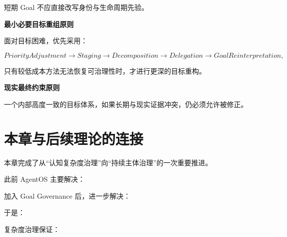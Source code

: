 \begin{statementbox}
\centering
{}
\end{statementbox}

短期 Goal 不应直接改写身份与生命周期先验。


\textbf{最小必要目标重组原则}

面对目标困难，优先采用：

\[
PriorityAdjustment
\rightarrow
Staging
\rightarrow
Decomposition
\rightarrow
Delegation
\rightarrow
GoalReinterpretation,
\]

只有较低成本方法无法恢复可治理性时，才进行更深的目标重构。


\textbf{现实最终约束原则}

\begin{statementbox}
\centering
{}
\end{statementbox}

一个内部高度一致的目标体系，如果长期与现实证据冲突，仍必须允许被修正。


\section{本章与后续理论的连接}

本章完成了从``认知复杂度治理''向``持续主体治理''的一次重要推进。

此前 AgentOS 主要解决：

\begin{statementbox}
\centering
{}
\end{statementbox}

加入 Goal Governance 后，进一步解决：

\begin{statementbox}
\centering
{}
\end{statementbox}

于是：

\begin{statementbox}
\centering
{}
\end{statementbox}

复杂度治理保证：

